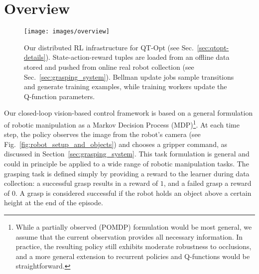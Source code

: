 \documentclass{article}
\begin{document}
\section{Overview}
\begin{wrapfigure}{rb}{0.5\textwidth}
\vspace{-0.5cm}
\begin{center}
 \texttt{[image: images/overview]}
\end{center}
   \vspace{-0.35cm}
   \caption{Our distributed RL infrastructure for QT-Opt (see Sec.~\ref{sec:qtopt-details}). State-action-reward tuples are loaded from an offline data stored and pushed from online real robot collection (see Sec.~\ref{sec:grasping_system}). Bellman update jobs sample transitions and generate training examples, while training workers update the Q-function parameters.}
\label{fig:distributed_infra_sketch}
\vspace{-0.2cm}
\end{wrapfigure}
Our closed-loop vision-based control framework is based on a general formulation of robotic manipulation as a Markov Decision Process (MDP)\footnote{While a partially observed (POMDP) formulation would be most general, we assume that the current observation provides all necessary information. In practice, the resulting policy still exhibits moderate robustness to occlusions, and a more general extension to recurrent policies and Q-functions would be straightforward.}. At each time step, the policy observes the image from the robot's camera (see Fig.~\ref{fig:robot_setup_and_objects}) and chooses a gripper command, as discussed in Section~\ref{sec:grasping_system}.
This task formulation is general and could in principle be applied to a wide range of robotic manipulation tasks. The grasping task is defined simply by providing a reward to the learner during data collection: a successful grasp results in a reward of $1$, and a failed grasp a reward of $0$. A grasp is considered successful if the robot holds an object above a certain height at the end of the episode.
\end{document}
